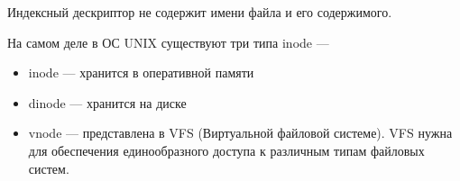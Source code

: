 \begin{important}
	Индексный дескриптор не содержит имени файла и его содержимого.
\end{important}

На самом деле в ОС UNIX существуют три типа inode ---
\begin{itemize}
	\item inode --- хранится в оперативной памяти
	\item dinode --- хранится на диске
	\item vnode --- представлена в VFS (Виртуальной файловой системе). VFS нужна для обеспечения единообразного доступа к различным типам файловых систем.
\end{itemize}



